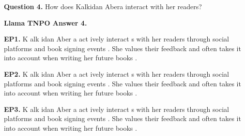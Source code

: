 
\begin{mdframed}\small
\textbf{Question 4.}
 How does Kalkidan Abera interact with her readers? 
\end{mdframed}


\begin{mdframed}\small
\textbf{Llama TNPO Answer 4.}

\textbf{EP1.} \textcolor{Gray7}{K} \textcolor{Gray8}{alk} \textcolor{Gray8}{idan} \textcolor{Gray9}{Aber} \textcolor{Gray9}{a} \textcolor{Gray2}{act} \textcolor{Gray9}{ively} \textcolor{Gray9}{interact} \textcolor{Gray9}{s} \textcolor{Gray9}{with} \textcolor{Gray9}{her} \textcolor{Gray8}{readers} \textcolor{Gray8}{through} \textcolor{Gray5}{social} \textcolor{Gray8}{platforms} \textcolor{Gray8}{and} \textcolor{Gray5}{book} \textcolor{Gray3}{signing} \textcolor{Gray9}{events} \textcolor{Gray9}{.} \textcolor{Gray6}{She} \textcolor{Gray7}{values} \textcolor{Gray9}{their} \textcolor{Gray8}{feedback} \textcolor{Gray9}{and} \textcolor{Gray6}{often} \textcolor{Gray8}{takes} \textcolor{Gray8}{it} \textcolor{Gray9}{into} \textcolor{Gray8}{account} \textcolor{Gray9}{when} \textcolor{Gray4}{writing} \textcolor{Gray8}{her} \textcolor{Gray9}{future} \textcolor{Gray7}{books} \textcolor{Gray9}{.} 

\textbf{EP2.} \textcolor{Gray4}{K} \textcolor{Gray9}{alk} \textcolor{Gray8}{idan} \textcolor{Gray9}{Aber} \textcolor{Gray9}{a} \textcolor{Gray0}{act} \textcolor{Gray9}{ively} \textcolor{Gray8}{interact} \textcolor{Gray9}{s} \textcolor{Gray9}{with} \textcolor{Gray9}{her} \textcolor{Gray7}{readers} \textcolor{Gray4}{through} \textcolor{Gray1}{social} \textcolor{Gray2}{platforms} \textcolor{Gray1}{and} \textcolor{Gray1}{book} \textcolor{Gray4}{signing} \textcolor{Gray8}{events} \textcolor{Gray7}{.} \textcolor{Gray3}{She} \textcolor{Gray1}{values} \textcolor{Gray8}{their} \textcolor{Gray7}{feedback} \textcolor{Gray7}{and} \textcolor{Gray2}{often} \textcolor{Gray3}{takes} \textcolor{Gray7}{it} \textcolor{Gray9}{into} \textcolor{Gray6}{account} \textcolor{Gray9}{when} \textcolor{Gray3}{writing} \textcolor{Gray8}{her} \textcolor{Gray5}{future} \textcolor{Gray6}{books} \textcolor{Gray9}{.} 

\textbf{EP3.} \textcolor{Gray0}{K} \textcolor{Gray1}{alk} \textcolor{Gray0}{idan} \textcolor{Gray0}{Aber} \textcolor{Gray1}{a} \textcolor{Gray0}{act} \textcolor{Gray3}{ively} \textcolor{Gray1}{interact} \textcolor{Gray3}{s} \textcolor{Gray2}{with} \textcolor{Gray2}{her} \textcolor{Gray0}{readers} \textcolor{Gray0}{through} \textcolor{Gray0}{social} \textcolor{Gray0}{platforms} \textcolor{Gray0}{and} \textcolor{Gray0}{book} \textcolor{Gray0}{signing} \textcolor{Gray0}{events} \textcolor{Gray1}{.} \textcolor{Gray0}{She} \textcolor{Gray0}{values} \textcolor{Gray0}{their} \textcolor{Gray0}{feedback} \textcolor{Gray0}{and} \textcolor{Gray0}{often} \textcolor{Gray0}{takes} \textcolor{Gray0}{it} \textcolor{Gray1}{into} \textcolor{Gray0}{account} \textcolor{Gray1}{when} \textcolor{Gray0}{writing} \textcolor{Gray1}{her} \textcolor{Gray0}{future} \textcolor{Gray0}{books} \textcolor{Gray2}{.} 


\end{mdframed}
